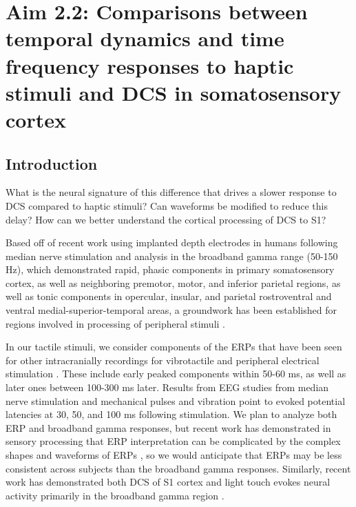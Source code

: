  
 
\chapter {Aim 2.2: Comparisons between temporal dynamics and time frequency responses to haptic stimuli and DCS in somatosensory cortex}

\section{Introduction}

What is the neural signature of this difference that drives a slower response to DCS compared to haptic stimuli? Can waveforms be modified to reduce this delay? How can we better understand the cortical processing of DCS to S1?

Based off of recent work using implanted depth electrodes in humans following median nerve stimulation and analysis in the broadband gamma range (50-150 Hz), which demonstrated rapid, phasic components in primary somatosensory cortex, as well as neighboring premotor, motor, and inferior parietal regions, as well as tonic components in opercular, insular, and parietal rostroventral and ventral medial-superior-temporal areas, a groundwork has been established for regions involved in processing of peripheral stimuli \cite{Avanzini2016,Avanzini2018}.

In our tactile stimuli, we consider components of the ERPs that have been seen for other intracranially recordings for vibrotactile \cite{Wahnoun2015} and peripheral electrical  stimulation \cite{Meador2002}. These include early peaked components within 50-60 ms, as well as later ones between 100-300 ms later. Results from EEG studies from median nerve stimulation and mechanical pulses and vibration \cite{Kalogianni2018,hamalainen1990human} point to evoked potential latencies at 30, 50, and 100 ms following stimulation. We plan to analyze both ERP and broadband gamma responses, but recent work has demonstrated in sensory processing that ERP interpretation can be complicated by the complex shapes and waveforms of ERPs \cite{Miller2016}, so we would anticipate that ERPs may be less consistent across subjects than the broadband gamma responses. Similarly, recent work has demonstrated both DCS of S1 cortex and light touch evokes neural activity primarily in the broadband gamma region \cite{Muller2017}.

